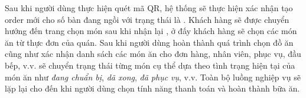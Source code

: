 Sau khi người dùng thực hiện quét mã QR, hệ thống sẽ thực hiện xác nhận tạo order mới cho số bàn đang ngồi với trạng thái là .
Khách hàng sẽ được chuyển hướng đến trang chọn món sau khi nhận lại , ở đấy khách hàng sẽ chọn các món ăn từ thực đơn của quán.
Sau khi người dùng hoàn thành quá trình chọn đồ ăn cũng như xác nhận danh sách các món ăn cho đơn hàng, nhân viên, phục vụ, đầu bếp, v.v. sẽ chuyển trạng thái từng món cụ thể dựa theo tình trạng hiện tại của món ăn như \textit{đang chuẩn bị}, \textit{dã xong}, \textit{đã phục vụ}, v.v.
Toàn bộ luồng nghiệp vụ sẽ lặp lại cho đến khi người dùng chọn tính năng thanh toán và hoàn thành bữa ăn.
